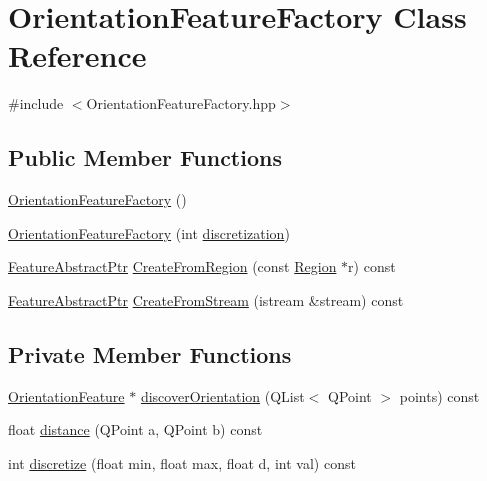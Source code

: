 \hypertarget{class_orientation_feature_factory}{\section{Orientation\+Feature\+Factory Class Reference}
\label{class_orientation_feature_factory}
}


{\ttfamily \#include $<$Orientation\+Feature\+Factory.\+hpp$>$}

\subsection*{Public Member Functions}
\begin{DoxyCompactItemize}
\item 
\hyperlink{class_orientation_feature_factory_a4975f56d33bdb633758b4a9fe156735d}{Orientation\+Feature\+Factory} ()
\item 
\hyperlink{class_orientation_feature_factory_ad78c564940442d3c76db9ef03d6c8a03}{Orientation\+Feature\+Factory} (int \hyperlink{class_orientation_feature_factory_abcd8932fe77877dff6657e4070882015}{discretization})
\item 
\hyperlink{class_feature_abstract_ptr}{Feature\+Abstract\+Ptr} \hyperlink{class_orientation_feature_factory_a979d7a274a149c806bd3d0fd2066d3ce}{Create\+From\+Region} (const \hyperlink{class_region}{Region} $\ast$r) const 
\item 
\hyperlink{class_feature_abstract_ptr}{Feature\+Abstract\+Ptr} \hyperlink{class_orientation_feature_factory_a65efa6b91ca535b2a47d5c9e972fd120}{Create\+From\+Stream} (istream \&stream) const 
\end{DoxyCompactItemize}
\subsection*{Private Member Functions}
\begin{DoxyCompactItemize}
\item 
\hyperlink{class_orientation_feature}{Orientation\+Feature} $\ast$ \hyperlink{class_orientation_feature_factory_a3ba5ebad39d7b2b6d1065208ee2fb60e}{discover\+Orientation} (Q\+List$<$ Q\+Point $>$ points) const 
\item 
float \hyperlink{class_orientation_feature_factory_a68e87a390c95060cac05065757daa18d}{distance} (Q\+Point a, Q\+Point b) const 
\item 
int \hyperlink{class_orientation_feature_factory_a280c15eebea7646e9b602c36979b8b16}{discretize} (float min, float max, float d, int val) const 
\end{DoxyCompactItemize}
